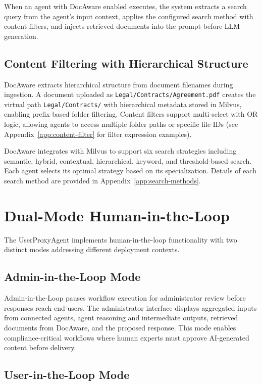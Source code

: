 \documentclass[11pt]{article}
\begin{document}
When an agent with DocAware enabled executes, the system extracts a search query from the agent's input context, applies the configured search method with content filters, and injects retrieved documents into the prompt before LLM generation.

\subsection{Content Filtering with Hierarchical Structure}

DocAware extracts hierarchical structure from document filenames during ingestion. A document uploaded as \texttt{Legal/Contracts/Agreement.pdf} creates the virtual path \texttt{Legal/Contracts/} with hierarchical metadata stored in Milvus, enabling prefix-based folder filtering. Content filters support multi-select with OR logic, allowing agents to access multiple folder paths or specific file IDs (see Appendix~\ref{app:content-filter} for filter expression examples).

DocAware integrates with Milvus to support six search strategies including semantic, hybrid, contextual, hierarchical, keyword, and threshold-based search. Each agent selects its optimal strategy based on its specialization. Details of each search method are provided in Appendix~\ref{app:search-methods}.


\section{Dual-Mode Human-in-the-Loop}
\label{sec:hitl}

The UserProxyAgent implements human-in-the-loop functionality with two distinct modes addressing different deployment contexts.

\subsection{Admin-in-the-Loop Mode}

Admin-in-the-Loop pauses workflow execution for administrator review before responses reach end-users. The administrator interface displays aggregated inputs from connected agents, agent reasoning and intermediate outputs, retrieved documents from DocAware, and the proposed response. This mode enables compliance-critical workflows where human experts must approve AI-generated content before delivery.

\subsection{User-in-the-Loop Mode}
\end{document}
